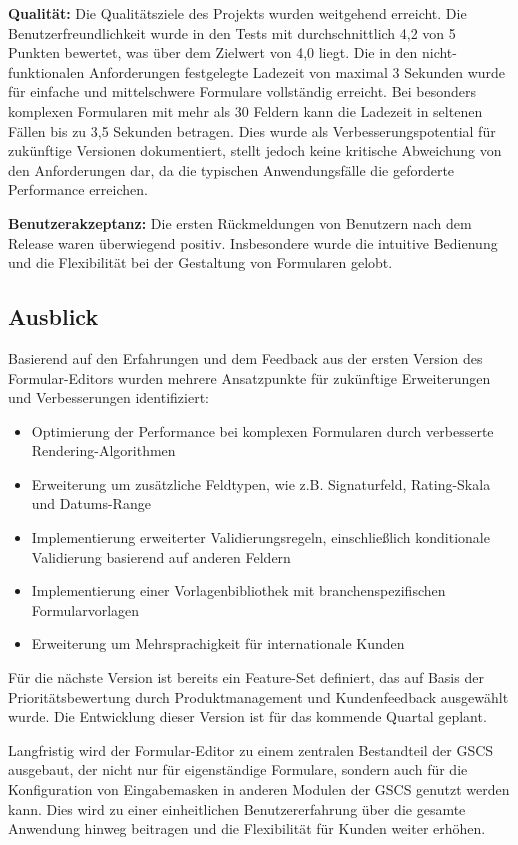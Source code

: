 \documentclass[a4paper,11pt]{article}
\begin{document}
\noindent \textbf{Qualität:} Die Qualitätsziele des Projekts wurden weitgehend erreicht. Die Benutzerfreundlichkeit wurde in den Tests mit durchschnittlich 4,2 von 5 Punkten bewertet, was über dem Zielwert von 4,0 liegt. Die in den nicht-funktionalen Anforderungen festgelegte Ladezeit von maximal 3 Sekunden wurde für einfache und mittelschwere Formulare vollständig erreicht. Bei besonders komplexen Formularen mit mehr als 30 Feldern kann die Ladezeit in seltenen Fällen bis zu 3,5 Sekunden betragen. Dies wurde als Verbesserungspotential für zukünftige Versionen dokumentiert, stellt jedoch keine kritische Abweichung von den Anforderungen dar, da die typischen Anwendungsfälle die geforderte Performance erreichen.

\noindent \textbf{Benutzerakzeptanz:} Die ersten Rückmeldungen von Benutzern nach dem Release waren überwiegend positiv. Insbesondere wurde die intuitive Bedienung und die Flexibilität bei der Gestaltung von Formularen gelobt.

\subsection{Ausblick}
Basierend auf den Erfahrungen und dem Feedback aus der ersten Version des Formular-Editors wurden mehrere Ansatzpunkte für zukünftige Erweiterungen und Verbesserungen identifiziert:

\begin{itemize}
  \item Optimierung der Performance bei komplexen Formularen durch verbesserte Rendering-Algorithmen
  \item Erweiterung um zusätzliche Feldtypen, wie z.B. Signaturfeld, Rating-Skala und Datums-Range
  \item Implementierung erweiterter Validierungsregeln, einschließlich konditionale Validierung basierend auf anderen Feldern
  \item Implementierung einer Vorlagenbibliothek mit branchenspezifischen Formularvorlagen
  \item Erweiterung um Mehrsprachigkeit für internationale Kunden
\end{itemize}

\noindent Für die nächste Version ist bereits ein Feature-Set definiert, das auf Basis der Prioritätsbewertung durch Produktmanagement und Kundenfeedback ausgewählt wurde. Die Entwicklung dieser Version ist für das kommende Quartal geplant.

\noindent Langfristig wird der Formular-Editor zu einem zentralen Bestandteil der GSCS ausgebaut, der nicht nur für eigenständige Formulare, sondern auch für die Konfiguration von Eingabemasken in anderen Modulen der GSCS genutzt werden kann. Dies wird zu einer einheitlichen Benutzererfahrung über die gesamte Anwendung hinweg beitragen und die Flexibilität für Kunden weiter erhöhen.
\end{document}
